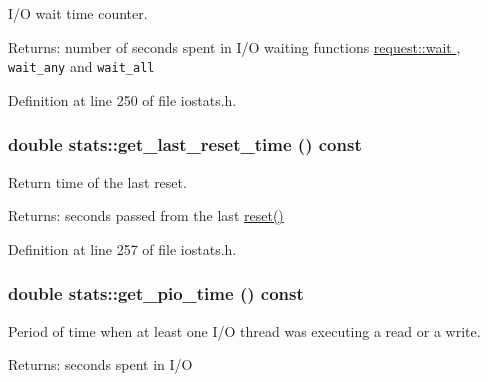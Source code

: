I/O wait time counter. 

\begin{Desc}
\item[Returns:]number of seconds spent in I/O waiting functions \hyperlink{group__iolayer_g2cdb5763d21b553ae816eb4152e5d89b}{request::wait }, {\tt wait\_\-any} and {\tt wait\_\-all} \end{Desc}


Definition at line 250 of file iostats.h.\hypertarget{group__iolayer_g536af25232d9f9f65e64fbf480b37846}{
\subsubsection[{get\_\-last\_\-reset\_\-time}]{\setlength{\rightskip}{0pt plus 5cm}double stats::get\_\-last\_\-reset\_\-time () const}}
\label{group__iolayer_g536af25232d9f9f65e64fbf480b37846}


Return time of the last reset. 

\begin{Desc}
\item[Returns:]seconds passed from the last \hyperlink{group__iolayer_g4b34c969ba2786ae1c29eb01708c2572}{reset()} \end{Desc}


Definition at line 257 of file iostats.h.\hypertarget{group__iolayer_g70efd6899577c26be66ad527c6776c44}{
\subsubsection[{get\_\-pio\_\-time}]{\setlength{\rightskip}{0pt plus 5cm}double stats::get\_\-pio\_\-time () const}}
\label{group__iolayer_g70efd6899577c26be66ad527c6776c44}


Period of time when at least one I/O thread was executing a read or a write. 

\begin{Desc}
\item[Returns:]seconds spent in I/O \end{Desc}


